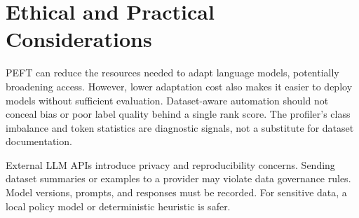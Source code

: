 \section{Ethical and Practical Considerations}

PEFT can reduce the resources needed to adapt language models, potentially broadening access.
However, lower adaptation cost also makes it easier to deploy models without sufficient evaluation.
Dataset-aware automation should not conceal bias or poor label quality behind a single rank score.
The profiler's class imbalance and token statistics are diagnostic signals, not a substitute for
dataset documentation.

External LLM APIs introduce privacy and reproducibility concerns. Sending dataset summaries or
examples to a provider may violate data governance rules. Model versions, prompts, and responses
must be recorded. For sensitive data, a local policy model or deterministic heuristic is safer.
